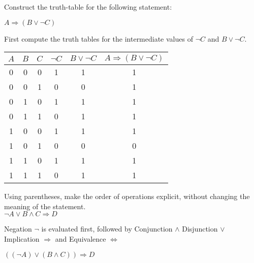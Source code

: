 \begin{problem}
  Construct the truth-table for the following statement:\\
  \begin{center}
    \(A \Rightarrow (B \lor \neg C)\)
  \end{center}

  \begin{hint}
    First compute the truth tables for the intermediate values of \(\neg C\) and
    \(B \lor \neg C\).
  \end{hint}

  \begin{sol}
    \begin{tabular}{ccc|cc|c}
      \(A\) & \(B\) & \(C\) & \(\neg C\) & \(B \lor \neg C\) &
      \(A \Rightarrow (B \lor \neg C)\)\\
      \hline
      0 & 0 & 0 & 1 & 1 & 1\\
      0 & 0 & 1 & 0 & 0 & 1\\
      0 & 1 & 0 & 1 & 1 & 1\\
      0 & 1 & 1 & 0 & 1 & 1\\
      1 & 0 & 0 & 1 & 1 & 1\\
      1 & 0 & 1 & 0 & 0 & 0\\
      1 & 1 & 0 & 1 & 1 & 1\\
      1 & 1 & 1 & 0 & 1 & 1\\
    \end{tabular}
  \end{sol}
\end{problem}

\begin{problem}
  Using parentheses, make the order of operations explicit, without changing the
  meaning of the statement.\\
  \(\neg A \lor B \land C \Rightarrow D\)

  \begin{hint}
    \begin{itemize}
      \ii{} Negation \(\neg\) is evaluated first, followed by
      \ii{} Conjunction \(\land\)
      \ii{} Disjunction \(\lor\)
      \ii{} Implication \(\Rightarrow\) and
      \ii{} Equivalence \(\Leftrightarrow\)
    \end{itemize}
  \end{hint}

  \begin{sol}
    \(((\neg A) \lor (B \land C)) \Rightarrow D\)
  \end{sol}
\end{problem}

